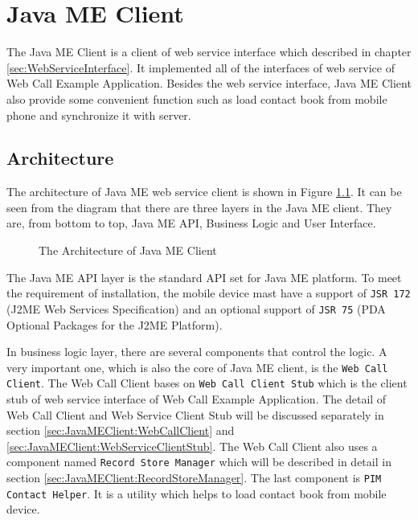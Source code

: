 
\chapter{Java ME Client}
\label{sec:JavaMEClient}

The Java ME Client is a client of web service interface which described in chapter \nolinebreak \ref{sec:WebServiceInterface}. It implemented all of the interfaces of web service of Web Call Example Application. Besides the web service interface, Java ME Client also provide some convenient function such as load contact book from mobile phone and synchronize it with server. 

\section{Architecture}
\label{sec:JavaMEClient:Architecture}

The architecture of Java ME web service client is shown in Figure \nolinebreak \ref{fig:TheArchitectureOfJavaMEClient}. It can be seen from the diagram that there are three layers in the Java ME client. They are, from bottom to top, Java ME API, Business Logic and User Interface. 

\begin{figure}[!hbtp]
\centering
{}
\caption{The Architecture of Java ME Client}
\label{fig:TheArchitectureOfJavaMEClient}
\end{figure}

The Java ME API layer is the standard API set for Java ME platform. To meet the requirement of installation, the mobile device mast have a support of \texttt{JSR 172} (J2ME\texttrademark{} Web Services Specification)\cite{JSR172} and an optional support of \texttt{JSR 75} (PDA Optional Packages for the J2ME Platform)\cite{JSR75}. 

In business logic layer, there are several components that control the logic. A very important one, which is also the core of Java ME client, is the \texttt{Web Call Client}. The Web Call Client bases on \texttt{Web Call Client Stub} which is the client stub of web service interface of Web Call Example Application. The detail of Web Call Client and Web Service Client Stub will be discussed separately in section \ref{sec:JavaMEClient:WebCallClient} and \ref{sec:JavaMEClient:WebServiceClientStub}. The Web Call Client also uses a component named \texttt{Record Store Manager} which will be described in detail in section \ref{sec:JavaMEClient:RecordStoreManager}. The last component is \texttt{PIM Contact Helper}. It is a utility which helps to load contact book from mobile device.

